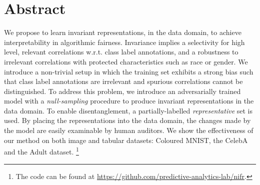 \section{Abstract}
\noindent
We propose to learn invariant representations, in the data domain, to achieve interpretability in algorithmic fairness. 
Invariance implies a selectivity for high level, relevant correlations w.r.t. class label annotations, and a robustness to irrelevant correlations with protected characteristics such as race or gender. 
We introduce a non-trivial setup in which the training set exhibits a strong bias such that class label annotations are irrelevant and spurious correlations cannot be distinguished.
To address this problem, we introduce an adversarially trained model with a \emph{null-sampling} procedure to produce invariant representations in the data domain.
To enable disentanglement, a partially-labelled \emph{representative} set is used.
By placing the representations into the data domain, the changes made by the model are easily examinable by human auditors.
We show the effectiveness of our method on both image and tabular datasets: Coloured MNIST, the CelebA and the Adult dataset.%
\footnote{The code can be found at \url{https://github.com/predictive-analytics-lab/nifr}.}

